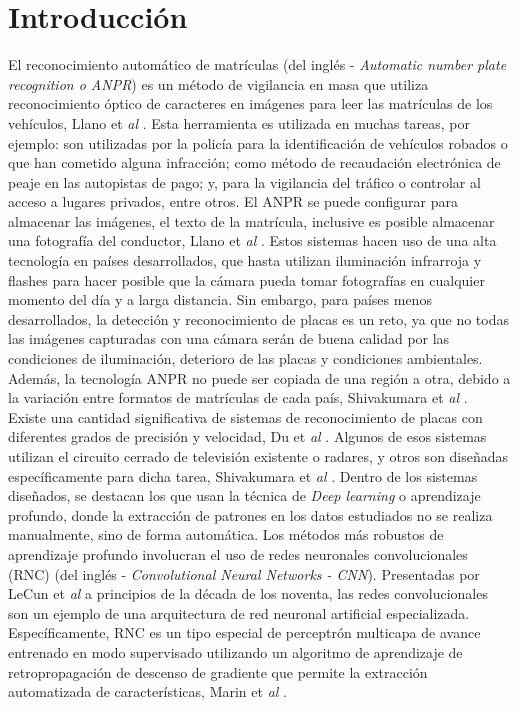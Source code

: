 \chapter*{Introducción}
El reconocimiento automático de matrículas (del inglés - \textit{Automatic number plate recognition o ANPR}) es un método de vigilancia en masa que utiliza reconocimiento óptico de caracteres en imágenes para leer las matrículas de los vehículos, Llano et \textit{al} \cite{llano2010sistema}. Esta herramienta es utilizada en muchas tareas, por ejemplo: son utilizadas por la policía para la identificación de vehículos robados o que han cometido alguna infracción; como método de recaudación electrónica de peaje en las autopistas de pago; y, para la vigilancia del tráfico o controlar al acceso a lugares privados, entre otros. El ANPR se puede configurar para almacenar las imágenes, el texto de la matrícula, inclusive es posible almacenar una fotografía del conductor, Llano et \textit{al} \cite{llano2010sistema}. Estos sistemas hacen uso de una alta tecnología en países desarrollados, que hasta utilizan iluminación infrarroja y flashes para hacer posible que la cámara pueda tomar fotografías en cualquier momento del día y a larga distancia. Sin embargo, para países menos desarrollados, la detección y reconocimiento de placas es un reto, ya que no todas las imágenes capturadas con una cámara serán de buena calidad por las condiciones de iluminación, deterioro de las placas y condiciones ambientales. Además, la tecnología ANPR no puede ser copiada de una región a otra, debido a la variación entre formatos de matrículas de cada país, Shivakumara et \textit{al} \cite{Shivakumara2018}.\\

Existe una cantidad significativa de sistemas de reconocimiento de placas con diferentes grados de precisión y velocidad, Du et \textit{al} \cite{Du2013}. Algunos de esos sistemas utilizan el circuito cerrado de televisión existente o radares, y otros son diseñadas específicamente para dicha tarea, Shivakumara et \textit{al} \cite{Shivakumara2018}. Dentro de los sistemas diseñados, se destacan los que usan la técnica de \textit{Deep learning} o aprendizaje profundo, donde la extracción de patrones en los datos estudiados no se realiza manualmente, sino de forma automática. Los métodos más robustos de aprendizaje profundo involucran el uso de redes neuronales convolucionales (RNC) (del inglés - \textit{Convolutional Neural Networks - CNN}). Presentadas por LeCun et \textit{al} \cite{lecun1989backpropagation} a principios de la década de los noventa, las redes convolucionales son un ejemplo de una arquitectura de red neuronal artificial especializada. Específicamente, RNC es un tipo especial de perceptrón multicapa de avance entrenado en modo supervisado utilizando un algoritmo de aprendizaje de retropropagación de descenso de gradiente que permite la extracción automatizada de características, Marin et \textit{al} \cite{marin2013introduccion}.\\ 

